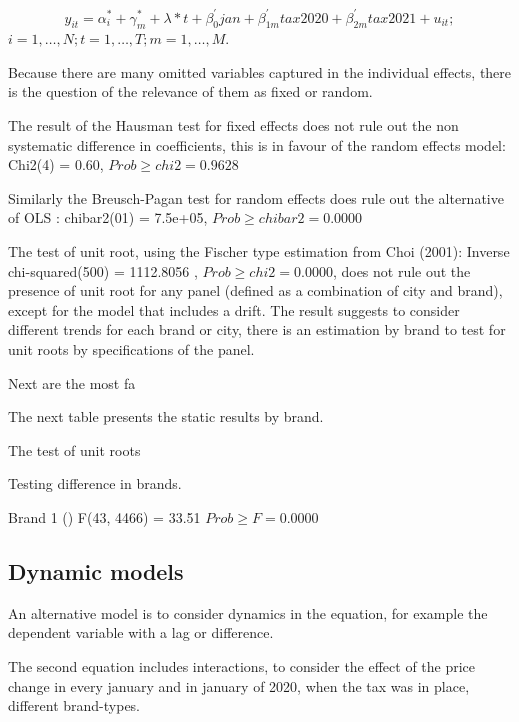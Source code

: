 \documentclass[]{article}
\begin{document}
\begin{equation*} 
	y_{it}  = \alpha_{i}^{*} + \gamma_{m}^{*} + \lambda*t + \beta_{0}^{'}jan + \beta_{1m}^{'}tax2020 + \beta_{2m}^{'}tax2021 + u_{it}
	;   \tag{4.2}
\end{equation*}
$i  = 1,\ldots,N;  t=1,\ldots,T; m=1,\ldots,M. $

Because there are many omitted variables captured in the individual effects, there is the question of the relevance of them as fixed or random.

The result of the Hausman test for fixed effects does not rule out the non systematic difference in coefficients, this is in favour of the random effects model: Chi2(4) =  0.60,
$Prob \geq chi2 =    0.9628$

Similarly the Breusch-Pagan test for random effects does rule out the alternative of OLS : chibar2(01) =  7.5e+05,
$Prob \geq chibar2 =    0.0000$

The test of unit root, using the Fischer type estimation from Choi (2001): 
Inverse chi-squared(500) = 1112.8056 , $Prob \geq chi2 =    0.0000$, does not rule out the presence of unit root for any panel (defined as a combination of city and brand), except for the model that includes a drift. The result suggests to consider different trends for each brand or city, there is an estimation by brand to test for unit roots by specifications of the panel.

Next are the most fa


The next table presents the static results by brand.

\begin{landscape}

\end{landscape}

%
The test of unit roots

Testing difference in brands.

Brand 1 ()
 F(43, 4466) = 33.51                   
$ Prob \geq F = 0.0000 $

%
 
\subsection{Dynamic models}
An alternative model is to consider dynamics in the equation, for example the dependent variable with a lag or difference. 

The second equation includes interactions, to consider the effect of the price change in every january and in january of 2020, when the tax was in place, different brand-types.
\end{document}
